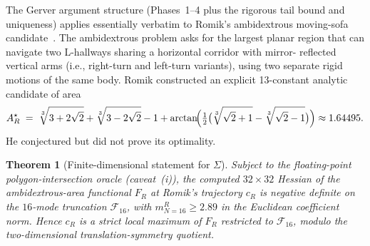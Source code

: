 \documentclass[11pt]{amsart}
\theoremstyle{plain}
\newtheorem{theorem}{Theorem}
\theoremstyle{definition}
\begin{document}
The Gerver argument structure (Phases~1--4 plus the rigorous tail
bound and uniqueness) applies essentially verbatim to Romik's
ambidextrous moving-sofa candidate~\cite{Romik2018}.  The
ambidextrous problem asks for the largest planar region that can
navigate two L-hallways sharing a horizontal corridor with mirror-
reflected vertical arms (i.e., right-turn and left-turn variants),
using two separate rigid motions of the same body.  Romik
constructed an explicit 13-constant analytic candidate of area
\begin{equation}
   A_{R}^{\star} \;=\; \sqrt[3]{3 + 2\sqrt{2}} + \sqrt[3]{3 - 2\sqrt{2}}
                       - 1 + \arctan\!\Bigl(\tfrac{1}{2}\bigl(\sqrt[3]{\sqrt{2} + 1}
                       - \sqrt[3]{\sqrt{2} - 1}\bigr)\Bigr) \approx 1.64495.
\end{equation}
He conjectured but did not prove its optimality.

\begin{theorem}[Finite-dimensional statement for $\Sigma$]
\label{thm:romik-localmax}
Subject to the floating-point polygon-intersection oracle
(caveat~(i)), the computed $32\times32$ Hessian of the
ambidextrous-area functional $F_{R}$ at Romik's trajectory $c_{R}$ is
negative definite on the $16$-mode truncation
$\mathcal{F}_{16}$, with $m_{N=16}^{R} \geq 2.89$ in the Euclidean
coefficient norm.  Hence $c_{R}$ is a strict local maximum of $F_{R}$
restricted to $\mathcal{F}_{16}$, modulo the two-dimensional
translation-symmetry quotient.
\end{theorem}
\end{document}
